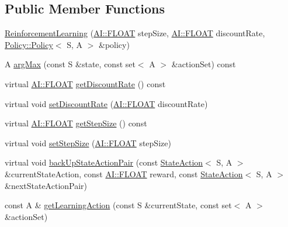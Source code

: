 \subsection*{Public Member Functions}
\begin{DoxyCompactItemize}
\item 
\hyperlink{classAI_1_1Algorithm_1_1ReinforcementLearning_a4d182d91c68aef838b80843acd044b1e}{Reinforcement\-Learning} (\hyperlink{namespaceAI_a41b74884a20833db653dded3918e05c3}{A\-I\-::\-F\-L\-O\-A\-T} step\-Size, \hyperlink{namespaceAI_a41b74884a20833db653dded3918e05c3}{A\-I\-::\-F\-L\-O\-A\-T} discount\-Rate, \hyperlink{classAI_1_1Algorithm_1_1Policy_1_1Policy}{Policy\-::\-Policy}$<$ S, A $>$ \&policy)
\item 
A \hyperlink{classAI_1_1Algorithm_1_1ReinforcementLearning_ad1d8a8ebb47fb71a53b15b770795e286}{arg\-Max} (const S \&state, const set$<$ A $>$ \&action\-Set) const 
\item 
virtual \hyperlink{namespaceAI_a41b74884a20833db653dded3918e05c3}{A\-I\-::\-F\-L\-O\-A\-T} \hyperlink{classAI_1_1Algorithm_1_1ReinforcementLearning_a04edb957e23dde9c6733668ad844c32b}{get\-Discount\-Rate} () const 
\item 
virtual void \hyperlink{classAI_1_1Algorithm_1_1ReinforcementLearning_a1fc1e11a3ddb4377c4d6813a95ce87f4}{set\-Discount\-Rate} (\hyperlink{namespaceAI_a41b74884a20833db653dded3918e05c3}{A\-I\-::\-F\-L\-O\-A\-T} discount\-Rate)
\item 
virtual \hyperlink{namespaceAI_a41b74884a20833db653dded3918e05c3}{A\-I\-::\-F\-L\-O\-A\-T} \hyperlink{classAI_1_1Algorithm_1_1ReinforcementLearning_a13e6c161a33644183d3d357971eeaaf5}{get\-Step\-Size} () const 
\item 
virtual void \hyperlink{classAI_1_1Algorithm_1_1ReinforcementLearning_a04932645faa6c385e4c587f7f845b484}{set\-Step\-Size} (\hyperlink{namespaceAI_a41b74884a20833db653dded3918e05c3}{A\-I\-::\-F\-L\-O\-A\-T} step\-Size)
\item 
virtual void \hyperlink{classAI_1_1Algorithm_1_1ReinforcementLearning_aa45b49ec954f6934df4d541b70076bd6}{back\-Up\-State\-Action\-Pair} (const \hyperlink{classAI_1_1StateAction}{State\-Action}$<$ S, A $>$ \&current\-State\-Action, const \hyperlink{namespaceAI_a41b74884a20833db653dded3918e05c3}{A\-I\-::\-F\-L\-O\-A\-T} reward, const \hyperlink{classAI_1_1StateAction}{State\-Action}$<$ S, A $>$ \&next\-State\-Action\-Pair)
\item 
const A \& \hyperlink{classAI_1_1Algorithm_1_1ReinforcementLearning_a9f31822bf51b07d17b31d7683d7e25a2}{get\-Learning\-Action} (const S \&current\-State, const set$<$ A $>$ \&action\-Set)

\end{DoxyCompactItemize}
